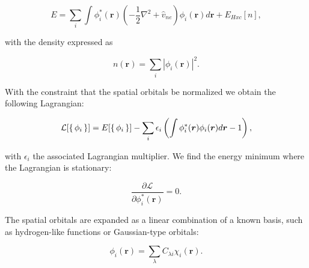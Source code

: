 \begin{equation}
    E = \sum_i \int \phi_i^* (\bm{r}) (-\frac{1}{2} \nabla^2 + \hat{v}_{ne})
        \phi_i(\bm{r}) d\bm{r} + E_{Hxc}[n] ,
\end{equation}

with the density expressed as

\begin{equation}
    n(\bm{r}) = \sum_i \left| \phi_i(\bm{r}) \right|^2 .
\end{equation}

With the constraint that the spatial orbitals be normalized
we obtain the following Lagrangian:

$$ \mathcal{L} [\set{\phi_i}]
    = E[\set{\phi_i}] - \sum_i \epsilon_i
    \left( \int \phi_i^* (\bm{r}) \phi_i(\bm{r}) d\bm{r} - 1 \right) , $$

with $\epsilon_i$ the associated Lagrangian multiplier.
We find the energy minimum where the Lagrangian is stationary:

$$ \frac{\partial \mathcal{L}}{\partial \phi_i^* (\bm{r})} = 0 . $$

The spatial orbitals are expanded as a linear combination
of a known basis, such as hydrogen-like functions
or Gaussian-type orbitals:

$$ \phi_i(\bm{r}) = \sum_{\lambda} C_{\lambda i} \chi_i (\bm{r}) . $$

